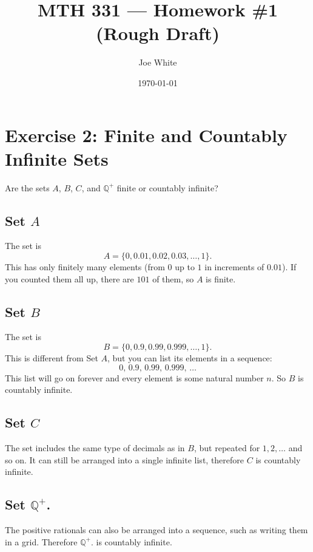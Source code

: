 \documentclass[11pt]{article}
\title{MTH 331 — Homework \#1 (Rough Draft)}
\author{Joe White}
\date{\today}
\begin{document}
\maketitle

\section*{Exercise 2: Finite and Countably Infinite Sets}

Are the sets $A$, $B$, $C$, and $\mathbb{Q}^+$ finite or countably infinite?

\subsection*{Set $A$}
The set is 
\[
A = \{0, 0.01, 0.02, 0.03, \dots, 1\}.
\]
This has only finitely many elements (from $0$ up to $1$ in increments of $0.01$). If you counted them all up, there are $101$ of them, so $A$ is finite.

\subsection*{Set $B$}
The set is
\[
B = \{0, 0.9, 0.99, 0.999, \dots, 1\}.
\]
This is different from Set $A$, but you can list its elements in a sequence:
\[
0,\,0.9,\,0.99,\,0.999,\,\dots
\]
This list will go on forever and every element is some natural number $n$. So $B$ is countably infinite.

\subsection*{Set $C$}
The set includes the same type of decimals as in $B$, but repeated for $1, 2, \dots$ and so on.
It can still be arranged into a single infinite list, therefore $C$ is countably infinite.

\subsection*{Set $\mathbb{Q}^+$.}
The positive rationals can also be arranged into a sequence, such as writing them in a grid. Therefore $\mathbb{Q}^+$. is countably infinite.
\end{document}
